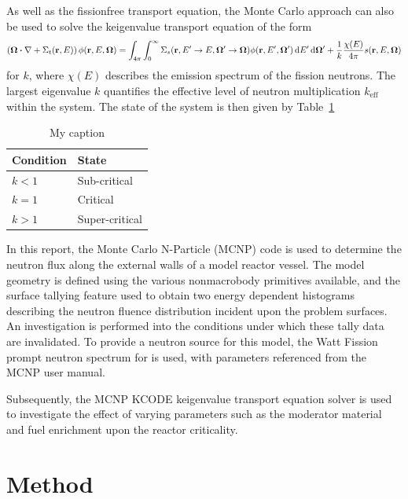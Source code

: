 \documentclass{article}
\begin{document}
As well as the fission\textendash free transport equation, the Monte Carlo approach can also be used to solve the k\textendash eigenvalue transport equation of the form
\begin{equation}
  \label{eq:k_eigenvalue_transport}
  \left(\vb{\Omega}\dotproduct\vb{\nabla}+\Sigma_t(\vb{r},E)\right)\phi(\vb{r},E,\vb{\Omega})=\int_{4\pi}{\int_0^\infty{\Sigma_s(\vb{r},E^\prime\rightarrow E,\vb{\Omega^\prime}\rightarrow\vb{\Omega})\phi(\vb{r},E^\prime,\vb{\Omega^\prime})\dd{E^\prime}}\dd{\vb{\Omega^\prime}}}+\frac{1}{k}\frac{\chi(E)}{4\pi}s(\vb{r},E,\vb{\Omega})
\end{equation}
for $k$, where $\chi(E)$ describes the emission spectrum of the fission neutrons. The largest eigenvalue $k$ quantifies the effective level of neutron multiplication $k_{\text{eff}}$ within the system. The state of the system is then given by Table~\ref{table:k}
\begin{table}[]
\centering
\caption{My caption}
\label{table:k}
\begin{tabular}{@{}ll@{}}
\toprule
Condition & State          \\ \midrule
$k < 1$   & Sub-critical   \\
$k = 1$   & Critical       \\
$k > 1$   & Super-critical \\ \bottomrule
\end{tabular}
\end{table}

In this report, the Monte Carlo N-Particle (MCNP) code is used to determine the neutron flux along the external walls of a model reactor vessel. The model geometry is defined using the various non\textendash macrobody primitives available, and the surface tallying feature used to obtain two energy dependent histograms describing the neutron fluence distribution incident upon the problem surfaces. An investigation is performed into the conditions under which these tally data are invalidated. To provide a neutron source for this model, the Watt Fission prompt neutron spectrum for  is used, with parameters referenced from the MCNP user manual.

Subsequently, the MCNP KCODE k\textendash eigenvalue transport equation solver is used to investigate the effect of varying parameters such as the moderator material and fuel enrichment upon the reactor criticality.

\section{Method}
\end{document}
